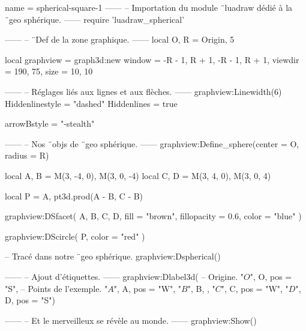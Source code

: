 \documentclass{standalone}
\begin{document}
\begin{luadraw}{name = spherical-square-1}
------
-- Importation du module ¨luadraw dédié à la ¨geo sphérique.
------
require 'luadraw_spherical'

------
-- ¨Def de la zone graphique.
------
local O, R = Origin, 5

local graphview = graph3d:new{
  window  = {-R - 1, R + 1, -R - 1, R + 1},
  viewdir = {190, 75},
  size    = {10, 10}
}

------
-- Réglages liés aux lignes et aux flèches.
------
graphview:Linewidth(6)
Hiddenlinestyle = "dashed"
Hiddenlines     = true

arrowBstyle = "-stealth"

------
-- Nos ¨objs de ¨geo sphérique.
------
graphview:Define_sphere({center = O, radius = R})

local A, B = M(3, -4, 0), M(3, 0, -4)
local C, D = M(3, 4, 0), M(3, 0, 4)

local P = {A, pt3d.prod(A - B, C - B)}

graphview:DSfacet(
  {A, B, C, D},
  {fill = "brown", fillopacity = 0.6, color = "blue"}
)

graphview:DScircle(
  P,
  {color = "red"}
)

-- Tracé dans notre ¨geo sphérique.
graphview:Dspherical()

------
-- Ajout d'étiquettes.
------
graphview:Dlabel3d(
-- Origine.
  "$O$", O, {pos = "S"},
-- Points de l'exemple.
  "$A$", A, {pos = "W"},
  "$B$", B, {},
  "$C$", C, {pos = "W"},
  "$D$", D, {pos = "S"})

------
-- Et le merveilleux se révèle au monde.
------
graphview:Show()
\end{luadraw}
\end{document}
